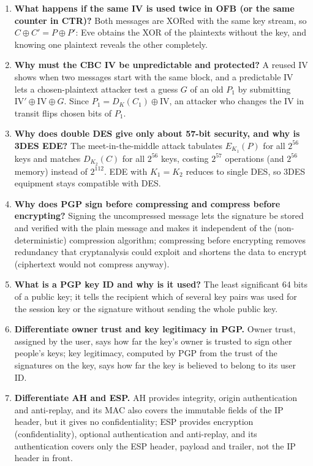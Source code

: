 \begin{enumerate}[leftmargin=1.6em,itemsep=3pt]
  \item \textbf{What happens if the same IV is used twice in OFB (or the same counter in CTR)?} Both messages are XORed with the same key stream, so $C \oplus C' = P \oplus P'$: Eve obtains the XOR of the plaintexts without the key, and knowing one plaintext reveals the other completely.
  \item \textbf{Why must the CBC IV be unpredictable and protected?} A reused IV shows when two messages start with the same block, and a predictable IV lets a chosen-plaintext attacker test a guess $G$ of an old $P_1$ by submitting $\mathrm{IV}' \oplus \mathrm{IV} \oplus G$. Since $P_1 = D_K(C_1) \oplus \mathrm{IV}$, an attacker who changes the IV in transit flips chosen bits of $P_1$.
  \item \textbf{Why does double DES give only about 57-bit security, and why is 3DES EDE?} The meet-in-the-middle attack tabulates $E_{K_1}(P)$ for all $2^{56}$ keys and matches $D_{K_2}(C)$ for all $2^{56}$ keys, costing $2^{57}$ operations (and $2^{56}$ memory) instead of $2^{112}$. EDE with $K_1 = K_2$ reduces to single DES, so 3DES equipment stays compatible with DES.
  \item \textbf{Why does PGP sign before compressing and compress before encrypting?} Signing the uncompressed message lets the signature be stored and verified with the plain message and makes it independent of the (non-deterministic) compression algorithm; compressing before encrypting removes redundancy that cryptanalysis could exploit and shortens the data to encrypt (ciphertext would not compress anyway).
  \item \textbf{What is a PGP key ID and why is it used?} The least significant 64 bits of a public key; it tells the recipient which of several key pairs was used for the session key or the signature without sending the whole public key.
  \item \textbf{Differentiate owner trust and key legitimacy in PGP.} Owner trust, assigned by the user, says how far the key's owner is trusted to sign other people's keys; key legitimacy, computed by PGP from the trust of the signatures on the key, says how far the key is believed to belong to its user ID.
  \item \textbf{Differentiate AH and ESP.} AH provides integrity, origin authentication and anti-replay, and its MAC also covers the immutable fields of the IP header, but it gives no confidentiality; ESP provides encryption (confidentiality), optional authentication and anti-replay, and its authentication covers only the ESP header, payload and trailer, not the IP header in front.

\end{enumerate}
